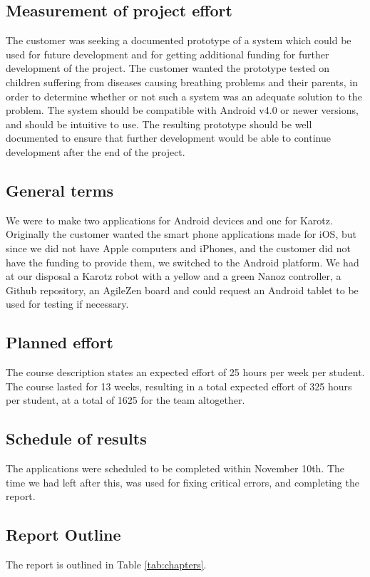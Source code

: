\subsection{Measurement of project effort}
The customer was seeking a documented prototype of a system which could be used for future 
development and for getting additional funding for further development of the project. The customer wanted
the prototype tested on children suffering from diseases causing breathing problems and their parents, in order
to determine whether or not such a system was an adequate solution to the problem. The system should be
compatible with Android v4.0 or newer versions, and should be intuitive to use. The resulting prototype should be well documented
to ensure that further development would be able to continue development after the end of the project.

\subsection{General terms}
We were to make two applications for Android devices and one for Karotz. Originally the customer wanted the smart phone applications made for iOS, 
but since we did not have Apple computers and iPhones, and the customer did not have the funding to provide them, we 
switched to the Android platform. We had at our disposal a Karotz robot with a yellow and a green Nanoz controller,
a Github repository, an AgileZen board and could request an Android tablet to be used for testing if necessary.

\subsection{Planned effort}
The course description states an expected effort of 25 hours per week per student. The course lasted for 13 weeks,
resulting in a total expected effort of 325 hours per student, at a total of 1625 for the team altogether.

\subsection{Schedule of results}
The applications were scheduled to be completed within November 10th. The time we had left after this, was used for fixing
critical errors, and completing the report.

\subsection{Report Outline}
The report is outlined in Table \ref{tab:chapters}. 

